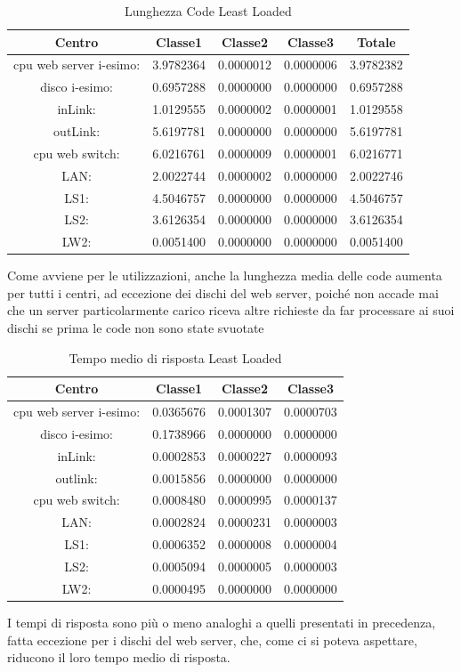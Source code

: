 \begin{table}[htbp]
\begin{center}
\begin{tabular}{||c|c|c|c|c||}
\hline
Centro &Classe1 &Classe2 &Classe3 &Totale\\
\hline
\hline
 cpu web server i-esimo: 	&3.9782364	&0.0000012	&0.0000006	&3.9782382\\
\hline
 disco i-esimo: 	&0.6957288	&0.0000000	&0.0000000	&0.6957288\\
\hline
 inLink: 	&1.0129555	&0.0000002	&0.0000001	&1.0129558\\
\hline
 outLink: 	&5.6197781	&0.0000000	&0.0000000	&5.6197781\\
\hline
 cpu web switch: 	&6.0216761	&0.0000009	&0.0000001	&6.0216771\\
\hline
 LAN: 	&2.0022744	&0.0000002	&0.0000000	&2.0022746\\
\hline
 LS1: 	&4.5046757	&0.0000000	&0.0000000	&4.5046757\\
\hline
 LS2: 	&3.6126354	&0.0000000	&0.0000000	&3.6126354\\
\hline
 LW2: 	&0.0051400	&0.0000000	&0.0000000	&0.0051400\\
\hline
\end{tabular}
\end{center}
\caption{Lunghezza Code Least Loaded}
\label{lunghezzacode}
\end{table}
Come avviene per le utilizzazioni, anche la lunghezza media delle code aumenta per tutti i centri, ad eccezione dei dischi del web server, poiché non accade mai che un server particolarmente carico riceva altre richieste da far processare ai suoi dischi se prima le code non sono state svuotate
\begin{table}[htbp]
\begin{center}
\begin{tabular}{||c|c|c|c||}
\hline
Centro &Classe1 &Classe2 &Classe3\\
\hline
\hline
 cpu web server i-esimo: 	&0.0365676	&0.0001307	&0.0000703\\
\hline
 disco i-esimo: 	&0.1738966	&0.0000000	&0.0000000\\
\hline
 inLink: 	&0.0002853	&0.0000227	&0.0000093\\
\hline
 outlink: 	&0.0015856	&0.0000000	&0.0000000\\
\hline
 cpu web switch: 	&0.0008480	&0.0000995	&0.0000137\\
\hline
 LAN: 	&0.0002824	&0.0000231	&0.0000003\\
\hline
 LS1: 	&0.0006352	&0.0000008	&0.0000004\\
\hline
 LS2: 	&0.0005094	&0.0000005	&0.0000003\\
\hline
 LW2: 	&0.0000495	&0.0000000	&0.0000000\\
\hline
\end{tabular}
\end{center}
\caption{Tempo medio di risposta Least Loaded}
\label{tempomediodirisposta}
\end{table}
I tempi di risposta sono più o meno analoghi a quelli presentati in precedenza, fatta eccezione per i dischi del web server, che, come ci si poteva aspettare, riducono il loro tempo medio di risposta.
